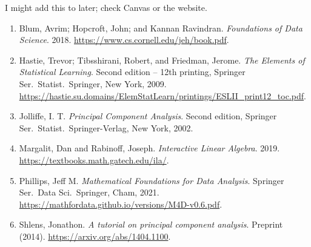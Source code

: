 \documentclass[a4paper, 12pt]{article}
\begin{document}
\begin{description}
    I might add this to later; check Canvas or the website.
    \begin{enumerate} 
      \item Blum, Avrim; Hopcroft, John; and Kannan Ravindran.
      \textit{Foundations of Data Science}. 2018.
      \url{https://www.cs.cornell.edu/jeh/book.pdf}.
      \item Hastie, Trevor; Tibsshirani, Robert, and Friedman, Jerome. \textit{The Elements of Statistical Learning}. Second edition -- 12th printing, Springer Ser.\ Statist.\ Springer, New York, 2009. \url{https://hastie.su.domains/ElemStatLearn/printings/ESLII_print12_toc.pdf}.
      \item Jolliffe, I. T. \textit{Principal Component Analysis}. Second
      edition, Springer Ser.\ Statist.\ Springer-Verlag, New York, 2002.
      \item Margalit, Dan and Rabinoff, Joseph. \textit{Interactive Linear
      Algebra}. 2019. \url{https://textbooks.math.gatech.edu/ila/}.
      \item Phillips, Jeff M. \textit{Mathematical Foundations for Data Analysis}. Springer Ser.\ Data Sci.\ Springer, Cham, 2021. \url{https://mathfordata.github.io/versions/M4D-v0.6.pdf}.
      \item Shlens, Jonathon. \textit{A tutorial on principal component
      analysis}. Preprint (2014). \url{https://arxiv.org/abs/1404.1100}.
    \end{enumerate}
\end{description}
\end{document}
